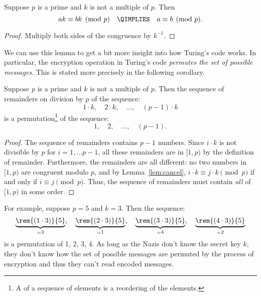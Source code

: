 \begin{lemma}
\label{lem:cancel}
Suppose $p$ is a prime and $k$ is not a multiple of $p$.  Then
%
\[
ak \equiv bk \pmod{p}\quad \QIMPLIES\quad a \equiv b \pmod{p}.
\]
\end{lemma}

\begin{proof}
Multiply both sides of the congruence by $k^{-1}$.
\end{proof}

We can use this lemma to get a bit more insight into how Turing's code
works.  In particular, the encryption operation in Turing's code
\emph{permutes the set of possible messages}.  This is stated more
precisely in the following corollary.

\begin{corollary}
\label{cor:prime-permutes}
Suppose $p$ is a prime and $k$ is not a multiple of $p$.  Then the
sequence of remainders on division by $p$ of the sequence:
\[
1 \cdot k,\quad
2 \cdot k,\quad
 \dots,\quad
(p-1) \cdot k
\]
is a permutation\footnote{A  of a sequence of elements
is a reordering of the elements.} of the sequence:
\[
1,\quad 2,\quad \dots,\quad (p - 1).
\]
\end{corollary}

\begin{proof}
The sequence of remainders contains $p-1$ numbers.  Since $i \cdot k$
is not divisible by $p$ for $i=1,\dots p-1$, all these remainders are
in $[1,p)$ by the definition of remainder.  Furthermore, the
  remainders are all different: no two numbers in $[1,p)$ are
    congruent modulo $p$, and by Lemma~\ref{lem:cancel}, $i \cdot k
    \equiv j \cdot k \pmod{p}$ if and only if $i \equiv j \pmod{p}$.
    Thus, the sequence of remainders must contain \emph{all} of
    $[1,p)$ in some order.
\end{proof}

For example, suppose $p = 5$ and $k = 3$.  Then the sequence:
%
\[
\underbrace{\rem{(1 \cdot 3)}{5}}_{=3},\quad
\underbrace{\rem{(2 \cdot 3)}{5}}_{=1},\quad
\underbrace{\rem{(3 \cdot 3)}{5}}_{=4},\quad
\underbrace{\rem{(4 \cdot 3)}{5}}_{=2}
\]
%
is a permutation of
1, 2, 3, 4.  As long as the Nazis don't know the secret key
$k$, they don't know how the set of possible messages are permuted by the
process of encryption and thus they can't read encoded messages.

